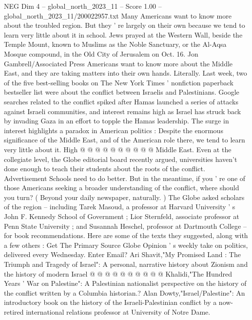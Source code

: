 \begin{textsample}{NEG Dim 4 – global\_north\_2023\_11 – Score 1.00 – global\_north\_2023\_11/200022957.txt}  \label{ex:f4_neg_253}
Many Americans want to know more about the troubled region.
But they ' re largely on their own because we tend to learn very little about it in school.
Jews prayed at the Western Wall, beside the Temple Mount, known to Muslims as the Noble Sanctuary, or the Al-Aqsa Mosque compound, in the Old City of Jerusalem on Oct. 16.
Jon Gambrell/Associated Press Americans want to know more about the Middle East, and they are taking matters into their own hands.
Literally.
Last week, two of the five best-selling books on The New York Times ' nonfiction paperback bestseller list were about the conflict between Israelis and Palestinians.
Google searches related to the conflict spiked after Hamas launched a series of attacks against Israeli communities, and interest remains high as Israel has struck back by invading Gaza in an effort to topple the Hamas leadership.
The surge in interest highlights a paradox in American politics : Despite the enormous significance of the Middle East, and of the American role there, we tend to learn very little about it.
High @ @ @ @ @ @ @ @ @ @ Middle East.
Even at the collegiate level, the Globe editorial board recently argued, universities haven't done enough to teach their students about the roots of the conflict.
Advertisement Schools need to do better.
But in the meantime, if you ' re one of those Americans seeking a broader understanding of the conflict, where should you turn? ( Beyond your daily newspaper, naturally. ) The Globe asked scholars of the region -- including Tarek Masoud, a professor at Harvard University ' s John F.
Kennedy School of Government ; Lior Sternfeld, associate professor at Penn State University ; and Susannah Heschel, professor at Dartmouth College -- for book recommendations.
Here are some of the texts they suggested, along with a few others : Get The Primary Source Globe Opinion ' s weekly take on politics, delivered every Wednesday.
Enter Email?
Ari Shavit,"My Promised Land : The Triumph and Tragedy of Israel": A personal, narrative history about Zionism and the history of modern Israel @ @ @ @ @ @ @ @ @ @ Khalidi,"The Hundred Years ' War on Palestine": A Palestinian nationalist perspective on the history of the conflict written by a Columbia historian.?
Alan Dowty,"Israel/Palestine": An introductory book on the history of the Israeli-Palestinian conflict by a now-retired international relations professor at University of Notre Dame.

\end{textsample}
